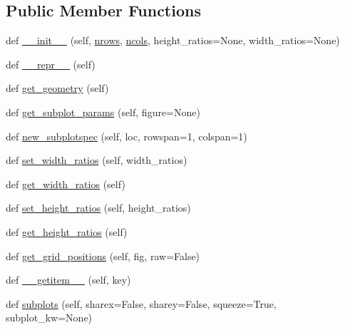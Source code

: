 \subsection*{Public Member Functions}
\begin{DoxyCompactItemize}
\item 
def \hyperlink{classmatplotlib_1_1gridspec_1_1GridSpecBase_aa7323731118c46021bffc09f83b9d12e}{\+\_\+\+\_\+init\+\_\+\+\_\+} (self, \hyperlink{classmatplotlib_1_1gridspec_1_1GridSpecBase_a610c62c29d638e1ed969419091c97f74}{nrows}, \hyperlink{classmatplotlib_1_1gridspec_1_1GridSpecBase_ad86cfae5903f2bf4e2fc878fd39461f3}{ncols}, height\+\_\+ratios=None, width\+\_\+ratios=None)
\item 
def \hyperlink{classmatplotlib_1_1gridspec_1_1GridSpecBase_afcb5eb447fb5c7d896d062ca331e404e}{\+\_\+\+\_\+repr\+\_\+\+\_\+} (self)
\item 
def \hyperlink{classmatplotlib_1_1gridspec_1_1GridSpecBase_a5573c4215322cc4f949dca53462387a2}{get\+\_\+geometry} (self)
\item 
def \hyperlink{classmatplotlib_1_1gridspec_1_1GridSpecBase_a4eac56d7bc403f516ad3159d81949f44}{get\+\_\+subplot\+\_\+params} (self, figure=None)
\item 
def \hyperlink{classmatplotlib_1_1gridspec_1_1GridSpecBase_a371e095a03c211ee7b141a2c698484fc}{new\+\_\+subplotspec} (self, loc, rowspan=1, colspan=1)
\item 
def \hyperlink{classmatplotlib_1_1gridspec_1_1GridSpecBase_ac41a6e9b9fa15ab24cf88386507e063d}{set\+\_\+width\+\_\+ratios} (self, width\+\_\+ratios)
\item 
def \hyperlink{classmatplotlib_1_1gridspec_1_1GridSpecBase_ab75773e6b14e1aa2afb5d0ab88ca019e}{get\+\_\+width\+\_\+ratios} (self)
\item 
def \hyperlink{classmatplotlib_1_1gridspec_1_1GridSpecBase_acc9d8b828917df50e639187a53f689b4}{set\+\_\+height\+\_\+ratios} (self, height\+\_\+ratios)
\item 
def \hyperlink{classmatplotlib_1_1gridspec_1_1GridSpecBase_a536a3b2325dd513f8d45d772fb4182c2}{get\+\_\+height\+\_\+ratios} (self)
\item 
def \hyperlink{classmatplotlib_1_1gridspec_1_1GridSpecBase_a26fab381dc449ba96f2f1846f5c0ccaa}{get\+\_\+grid\+\_\+positions} (self, fig, raw=False)
\item 
def \hyperlink{classmatplotlib_1_1gridspec_1_1GridSpecBase_a3fa8a0ae248f9e788b68dbed90231caf}{\+\_\+\+\_\+getitem\+\_\+\+\_\+} (self, key)
\item 
def \hyperlink{classmatplotlib_1_1gridspec_1_1GridSpecBase_a7d3bdfe4e0991646111adb0388ebc9c7}{subplots} (self, sharex=False, sharey=False, squeeze=True, subplot\+\_\+kw=None)
\end{DoxyCompactItemize}
